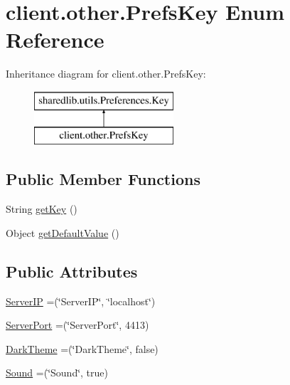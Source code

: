 \hypertarget{enumclient_1_1other_1_1_prefs_key}{}\section{client.\+other.\+Prefs\+Key Enum Reference}
\label{enumclient_1_1other_1_1_prefs_key}
Inheritance diagram for client.\+other.\+Prefs\+Key\+:\begin{figure}[H]
\begin{center}
\leavevmode
\includegraphics[height=2.000000cm]{enumclient_1_1other_1_1_prefs_key}
\end{center}
\end{figure}
\subsection*{Public Member Functions}
\begin{DoxyCompactItemize}
\item 
String \hyperlink{enumclient_1_1other_1_1_prefs_key_a204beaf7ef2607c5ee052bf712d5fc66}{get\+Key} ()
\item 
Object \hyperlink{enumclient_1_1other_1_1_prefs_key_a7d50bec7ffef68ca2b9657cc4a8b271f}{get\+Default\+Value} ()
\end{DoxyCompactItemize}
\subsection*{Public Attributes}
\begin{DoxyCompactItemize}
\item 
\hyperlink{enumclient_1_1other_1_1_prefs_key_afb3297cc8cba1e49ec031c14e115feb8}{Server\+IP} =(\char`\"{}Server\+IP\char`\"{}, \char`\"{}localhost\char`\"{})
\item 
\hyperlink{enumclient_1_1other_1_1_prefs_key_a967610c3389ceac5034551d3f69c564c}{Server\+Port} =(\char`\"{}Server\+Port\char`\"{}, 4413)
\item 
\hyperlink{enumclient_1_1other_1_1_prefs_key_a1712884dcd2b70030aa4e9baadfc5d65}{Dark\+Theme} =(\char`\"{}Dark\+Theme\char`\"{}, false)
\item 
\hyperlink{enumclient_1_1other_1_1_prefs_key_a8ad253d1a3c77e65df307909afb7f52f}{Sound} =(\char`\"{}Sound\char`\"{}, true)
\end{DoxyCompactItemize}


